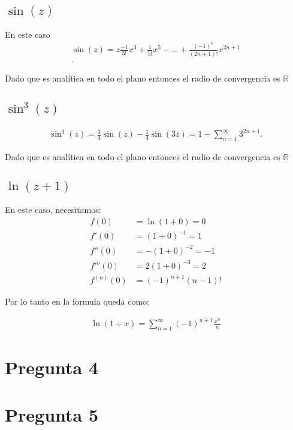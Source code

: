 \documentclass[12pt]{exam}
\begin{document}
\subsection*{$\sin(z)$}

En este caso
\begin{align*}
  \sin\left( z \right)  = z \frac{-1}{3!}x^3 + \frac{1}{5!}x^5 - \ldots + \frac{(-1)^n}{(2n + 1)!}x^{2n+1}\\
.\end{align*}

Dado que es analítica en todo el plano entonces el radio de convergencia es $\mathbb{R}$

\subsection*{$\sin^3(z)$}

\begin{align*}
  \sin^3\left( z \right) = \frac{3}{4}\sin\left( z \right) - \frac{1}{4}\sin\left( 3z \right) = 1 - \sum_{n=1}^{\infty} 3^{2n + 1}
.\end{align*}

Dado que es analítica en todo el plano entonces el radio de convergencia es $\mathbb{R}$

\subsection*{$\ln(z + 1)$}

En este caso, necesitamos:
\begin{align*}
  f(0) &= \ln(1 + 0) = 0\\
  f'(0) &= (1 + 0)^{-1} = 1\\
  f''(0) &= -(1 + 0)^{-2} = -1\\
  f'''(0) &= 2(1 + 0)^{-3} = 2\\
  f^{(n)}(0) &= (-1)^{n+1}(n-1)!
\end{align*}

Por lo tanto en la formula queda como:

\begin{align*}
  \ln(1 + x) = \sum_{n=1}^{\infty} (-1)^{n + 1}\frac{x^n}{n}
\end{align*}

\section*{Pregunta 4}

\section*{Pregunta 5}
\end{document}
